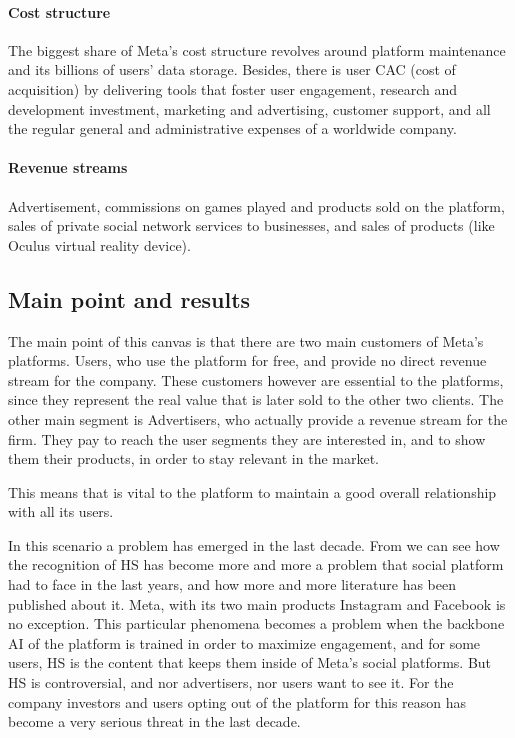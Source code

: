 \paragraph{Cost structure}
The biggest share of Meta's cost structure revolves around platform
maintenance and its billions of users' data storage. Besides, there is
user CAC (cost of acquisition) by delivering tools that foster user
engagement, research and development investment, marketing and
advertising, customer support, and all the regular general and
administrative expenses of a worldwide company.

\paragraph{Revenue streams}
Advertisement, commissions on games played and products sold on the
platform, sales of private social network services to businesses, and
sales of products (like Oculus virtual reality device).

\subsection{Main point and results}
The main point of this canvas is that there are two main customers of
Meta's platforms. Users, who use the platform for free, and provide no
direct revenue stream for the company. These customers however are
essential to the platforms, since they represent the real value that
is later sold to the other two clients. The other main segment is
Advertisers, who actually provide a revenue stream for the firm. They
pay to reach the user segments they are interested in, and to show
them their products, in order to stay relevant in the market.

This means that is vital to the platform to maintain a good overall
relationship with all its users.

In this scenario a problem has emerged in the last decade. From
\cite{art:fortuna2018survey} we can see how the recognition of HS has
become more and more a problem that social platform had to face in the
last years, and how more and more literature has been published about
it. Meta, with its two main products Instagram and Facebook is no
exception. This particular phenomena becomes a problem when the
backbone AI of the platform is trained in order to maximize
engagement, and for some users, HS is the content that keeps them
inside of Meta's social platforms. But HS is controversial, and nor
advertisers, nor users want to see it. For the company investors and
users opting out of the platform for this reason has become a very
serious threat in the last decade.

